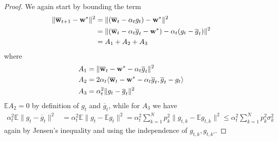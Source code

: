 \begin{proof}
	We again start by bounding the term
	\begin{align*}
	\|{\overline{\mathbf{w}}}_{t+1}-{\mathbf{w}}^{\ast}\|^{2} & =\|({\overline{\mathbf{w}}}_{t}-\alpha_{t}g_{t})-{\mathbf{w}}^{\ast}\|^{2}\\
	& =\|({\overline{\mathbf{w}}}_{t}-\alpha_{t}\overline{g}_{t}-{\mathbf{w}}^{\ast})-\alpha_{t}(g_{t}-\overline{g}_{t})\|^{2}\\
	& =A_{1}+A_{2}+A_{3}
	\end{align*}
	where 
	\begin{align*}
	A_{1} & =\|{\overline{\mathbf{w}}}_{t}-{\mathbf{w}}^{\ast}-\alpha_{t}\overline{g}_{t}\|^{2}\\
	A_{2} & =2\alpha_{t}\langle{\overline{\mathbf{w}}}_{t}-{\mathbf{w}}^{\ast}-\alpha_{t}\overline{g}_{t},\overline{g}_{t}-g_{t}\rangle\\
	A_{3} & =\alpha_{t}^{2}\|g_{t}-\overline{g}_{t}\|^{2}
	\end{align*}
	$\mathbb{E}A_{2}=0$ by definition of $g_{t}$ and $\overline{g}_{t}$,
	while for $A_{3}$ we have
	\begin{align*}
	\alpha_{t}^{2}\mathbb{E}\|g_{t}-\overline{g}_{t}\|^{2} & =\alpha_{t}^{2}\mathbb{E}\|g_{t}-\mathbb{E}g_{t}\|^{2}=\alpha_{t}^{2}\sum_{k=1}^{N}p_{k}^{2}\|g_{t,k}-\mathbb{E}g_{t,k}\|^{2}\leq\alpha_{t}^{2}\sum_{k=1}^{N}p_{k}^{2}\sigma_{k}^{2}
	\end{align*}
	again by Jensen's inequality and using the independence of $g_{t,k},g_{t,k'}$. 
	

\end{proof}
